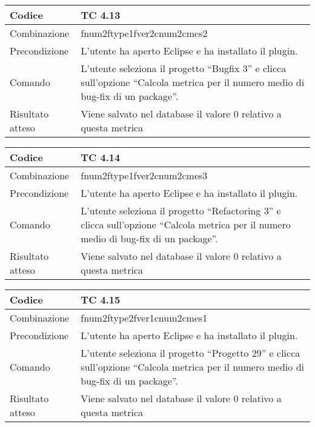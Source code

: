 \begin{table}[ht]
\begin{tabular}{|p{3cm}|p{9cm}|}
\hline
\cellcolor{lightgray}Codice				& TC 4.13								\\
\hline
\cellcolor{lightgray}Combinazione		& fnum2ftype1fver2cnum2cmes2									\\
\hline
\cellcolor{lightgray}Precondizione		& L'utente ha aperto Eclipse e ha installato il plugin.					\\
\hline
\cellcolor{lightgray}Comando			& L'utente seleziona il progetto ``Bugfix 3''  e clicca sull'opzione ``Calcola metrica per il numero medio di bug-fix di un package''.	\\
\hline
\cellcolor{lightgray}Risultato atteso	& Viene salvato nel database il valore 0 relativo a questa metrica	\\
\hline
\end{tabular}
\end{table}

\begin{table}[ht]
\begin{tabular}{|p{3cm}|p{9cm}|}
\hline
\cellcolor{lightgray}Codice				& TC 4.14								\\
\hline
\cellcolor{lightgray}Combinazione		& fnum2ftype1fver2cnum2cmes3								\\
\hline
\cellcolor{lightgray}Precondizione		& L'utente ha aperto Eclipse e ha installato il plugin.			\\
\hline
\cellcolor{lightgray}Comando			& L'utente seleziona il progetto ``Refactoring 3''  e clicca sull'opzione ``Calcola metrica per il numero medio di bug-fix di un package''.	\\
\hline
\cellcolor{lightgray}Risultato atteso	& Viene salvato nel database il valore 0 relativo a questa metrica	\\
\hline
\end{tabular}
\end{table}

\begin{table}[ht]
\begin{tabular}{|p{3cm}|p{9cm}|}
\hline
\cellcolor{lightgray}Codice				& TC 4.15								\\
\hline
\cellcolor{lightgray}Combinazione		& fnum2ftype2fver1cnum2cmes1 									\\
\hline
\cellcolor{lightgray}Precondizione		& L'utente ha aperto Eclipse e ha installato il plugin.			\\
\hline
\cellcolor{lightgray}Comando			& L'utente seleziona il progetto ``Progetto 29''  e clicca sull'opzione ``Calcola metrica per il numero medio di bug-fix di un package''.	\\
\hline
\cellcolor{lightgray}Risultato atteso	& Viene salvato nel database il valore 0 relativo a questa metrica	\\
\hline
\end{tabular}
\end{table}


